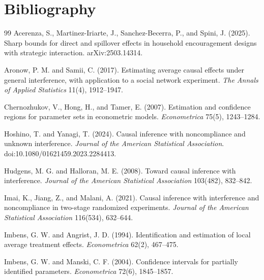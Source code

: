 \documentclass[11pt]{article}
\theoremstyle{definition}
\theoremstyle{plain}
\theoremstyle{remark}
\begin{document}
\section*{Bibliography}
\begin{thebibliography}{99}
Acerenza, S., Martinez-Iriarte, J., Sanchez-Becerra, P., and Spini, J. (2025).
Sharp bounds for direct and spillover effects in household encouragement designs with strategic interaction.
arXiv:2503.14314.

Aronow, P. M. and Samii, C. (2017).
Estimating average causal effects under general interference, with application to a social network experiment.
\emph{The Annals of Applied Statistics} 11(4), 1912--1947.

Chernozhukov, V., Hong, H., and Tamer, E. (2007).
Estimation and confidence regions for parameter sets in econometric models.
\emph{Econometrica} 75(5), 1243--1284.

Hoshino, T. and Yanagi, T. (2024).
Causal inference with noncompliance and unknown interference.
\emph{Journal of the American Statistical Association}. doi:10.1080/01621459.2023.2284413.

Hudgens, M. G. and Halloran, M. E. (2008).
Toward causal inference with interference.
\emph{Journal of the American Statistical Association} 103(482), 832--842.

Imai, K., Jiang, Z., and Malani, A. (2021).
Causal inference with interference and noncompliance in two-stage randomized experiments.
\emph{Journal of the American Statistical Association} 116(534), 632--644.

Imbens, G. W. and Angrist, J. D. (1994).
Identification and estimation of local average treatment effects.
\emph{Econometrica} 62(2), 467--475.

Imbens, G. W. and Manski, C. F. (2004).
Confidence intervals for partially identified parameters.
\emph{Econometrica} 72(6), 1845--1857.


\end{thebibliography}
\end{document}

